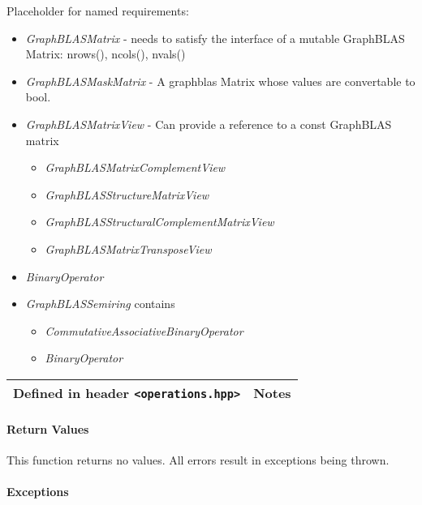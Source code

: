 Placeholder for named requirements:

\begin{itemize}
\item \emph{GraphBLASMatrix} - needs to satisfy the interface of a mutable GraphBLAS Matrix: nrows(), ncols(), nvals()
\item \emph{GraphBLASMaskMatrix} - A graphblas Matrix whose values are convertable to bool.
\item \emph{GraphBLASMatrixView} - Can provide a reference to a const GraphBLAS matrix
    \begin{itemize}
    \item \emph{GraphBLASMatrixComplementView}
    \item \emph{GraphBLASStructureMatrixView}
    \item \emph{GraphBLASStructuralComplementMatrixView}
    \item \emph{GraphBLASMatrixTransposeView}
    \end{itemize}
\item \emph{BinaryOperator}
\item \emph{GraphBLASSemiring} contains
    \begin{itemize}
    \item \emph{CommutativeAssociativeBinaryOperator}
    \item \emph{BinaryOperator}
    \end{itemize}
\end{itemize}

\begin{tabularx}{\textwidth}{X l}
Defined in header \texttt{<operations.hpp>}  &  \textbf{Notes} \\
\hline
\end{tabularx}

\paragraph{Return Values}

This function returns no values.  All errors result in exceptions being thrown.


\paragraph{Exceptions}

